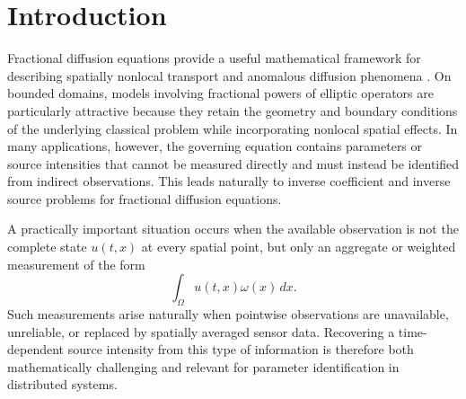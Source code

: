 \documentclass[reqno]{amsart}
\begin{document}
\maketitle
{}
\newtheorem{theorem}{Theorem}[section]
\newtheorem{lemma}[theorem]{Lemma}
\newtheorem{corollary}[theorem]{Corollary}
\newtheorem{remark}[theorem]{Remark}
\newtheorem{definition}[theorem]{Definition}
\newtheorem{problem}[theorem]{Problem}
\newtheorem{proposition}[theorem]{Proposition}
\newtheorem{assumption}[theorem]{Assumption}
\allowdisplaybreaks

\section{Introduction}\label{1}

Fractional diffusion equations provide a useful mathematical framework for
describing spatially nonlocal transport and anomalous diffusion phenomena \cite{Kwasnicki17,Bouchaud90, Valdinoci09,Daoud22}.
On bounded domains, models involving fractional powers of elliptic operators
are particularly attractive because they retain the geometry and boundary
conditions of the underlying classical problem while incorporating nonlocal
spatial effects. In many applications, however, the governing equation
contains parameters or source intensities that cannot be measured directly
and must instead be identified from indirect observations. This leads
naturally to inverse coefficient and inverse source problems for fractional
diffusion equations.

A practically important situation occurs when the available observation is
not the complete state $u(t,x)$ at every spatial point, but only an aggregate
or weighted measurement of the form
\[
\int_{\Omega}u(t,x)\omega(x)\,dx.
\]
Such measurements arise naturally when pointwise observations are
unavailable, unreliable, or replaced by spatially averaged sensor data.
Recovering a time-dependent source intensity from this type of information
is therefore both mathematically challenging and relevant for parameter
identification in distributed systems.
\end{document}
